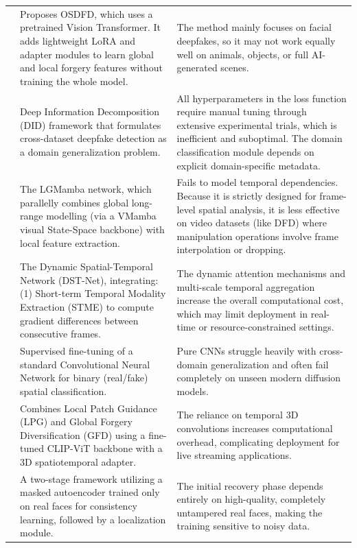\documentclass[sn-mathphys-num,Numbered,pdflatex]{sn-jnl}
\begin{document}
\begin{table}[htbp]
\begin{tabularx}{\columnwidth}{@{}p{} X X@{}}
\cite{OpensetDeepfake40} & Proposes OSDFD, which uses a pretrained Vision Transformer. It adds lightweight LoRA and adapter modules to learn global and local forgery features without training the whole model. & The method mainly focuses on facial deepfakes, so it may not work equally well on animals, objects, or full AI-generated scenes. \\
\cite{CrossdfImproving44} & Deep Information Decomposition (DID) framework that formulates cross-dataset deepfake detection as a domain generalization problem. & All hyperparameters in the loss function require manual tuning through extensive experimental trials, which is inefficient and suboptimal. The domain classification module depends on explicit domain-specific metadata. \\
\cite{TowardsGeneralizable49} & The LGMamba network, which parallelly combines global long-range modelling (via a VMamba visual State-Space backbone) with local feature extraction. & Fails to model temporal dependencies. Because it is strictly designed for frame-level spatial analysis, it is less effective on video datasets (like DFD) where manipulation operations involve frame interpolation or dropping. \\
\cite{DynamicSpatialtemporal50} & The Dynamic Spatial-Temporal Network (DST-Net), integrating: (1) Short-term Temporal Modality Extraction (STME) to compute gradient differences between consecutive frames. & The dynamic attention mechanisms and multi-scale temporal aggregation increase the overall computational cost, which may limit deployment in real-time or resource-constrained settings. \\
\cite{DeepfakeDetection57} & Supervised fine-tuning of a standard Convolutional Neural Network for binary (real/fake) spatial classification. & Pure CNNs struggle heavily with cross-domain generalization and often fail completely on unseen modern diffusion models. \\
\cite{DeepshieldFortifying61} & Combines Local Patch Guidance (LPG) and Global Forgery Diversification (GFD) using a fine-tuned CLIP-ViT backbone with a 3D spatiotemporal adapter. & The reliance on temporal 3D convolutions increases computational overhead, complicating deployment for live streaming applications. \\
\cite{DelocateDetection63} & A two-stage framework utilizing a masked autoencoder trained only on real faces for consistency learning, followed by a localization module. & The initial recovery phase depends entirely on high-quality, completely untampered real faces, making the training sensitive to noisy data. \\
\bottomrule
\end{tabularx}
\end{table}
\FloatBarrier
\end{document}
